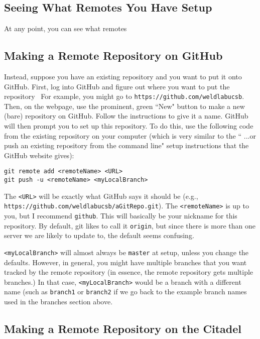 \documentclass[11pt]{article}
\newcommand{\code}[1]{\begin{adjustwidth}{0.5in}{0in}
    \texttt{#1}
    \end{adjustwidth}}
\begin{document}
\subsection{Seeing What Remotes You Have Setup}

At any point, you can see what remotes 

\subsection{Making a Remote Repository on GitHub}

Instead, suppose you have an existing repository and you want to put it onto GitHub.  First, log into GitHub and figure out where you want to put the repository \textemdash\ For example, you might go to \texttt{https://github.com/weldlabucsb}.  Then, on the webpage, use the prominent, green ``New" button to make a new (bare) repository on GitHub.  Follow the instructions to give it a name.  GitHub will then prompt you to set up this repository.  To do this, use the following code from the existing repository on your computer (which is very similar to the `` ...or push an existing repository from the command line" setup instructions that the GitHub website gives):

\code{git remote add <remoteName> <URL>\\
git push -u <remoteName> <myLocalBranch>}

The \texttt{<URL>} will be exactly what GitHub says it should be (e.g., \texttt{https://github.com/weldlabucsb/aGitRepo.git}).  The \texttt{<remoteName>} is up to you, but I recommend \texttt{github}.  This will basically be your nickname for this repository.  By default, git likes to call it \texttt{origin}, but since there is more than one server we are likely to update to, the default seems confusing.

\texttt{<myLocalBranch>} will almost always be \texttt{master} at setup, unless you change the defaults.  However, in general, you might have multiple branches that you want tracked by the remote repository (in essence, the remote repository gets multiple branches.)  In that case, \texttt{<myLocalBranch>} would be a branch with a different name (such as \texttt{branch1} or \texttt{branch2} if we go back to the example branch names used in the branches section above.

\subsection{Making a Remote Repository on the Citadel}
\end{document}

